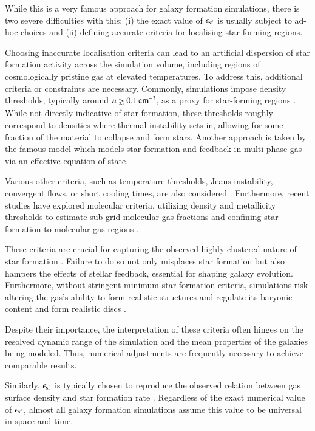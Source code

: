 \documentclass{aa}
\def\gtrsim{\mathrel{\hbox{\rlap{\hbox{\lower4pt\hbox{$\sim$}}}\hbox{$>$}}}}
\begin{document}
While this is a very famous approach for galaxy formation simulations, there is two severe difficulties with this: (i) the exact value of $\epsilon_{\rm sf}$ is usually subject to ad-hoc choices and (ii) defining accurate criteria for localising star forming regions.

Choosing inaccurate localisation criteria can lead to an artificial dispersion of star formation activity across the simulation volume, including regions of cosmologically pristine gas at elevated temperatures. To address this, additional criteria or constraints are necessary. Commonly, simulations impose density thresholds, typically around \( n \gtrsim 0.1\, \text{cm}^{-3} \), as a proxy for star-forming regions \citep[e.g.][]{Stinson_2006}. While not directly indicative of star formation, these thresholds roughly correspond to densities where thermal instability sets in, allowing for some fraction of the material to collapse and form stars. Another approach is taken by the famous \cite{Springel_2003} model which models star formation and feedback in multi-phase gas via an effective equation of state.

Various other criteria, such as temperature thresholds, Jeans instability, convergent flows, or short cooling times, are also considered \citep[see e.g.][for a comparison of such criteria]{Hopkins_2013}. Furthermore, recent studies have explored molecular criteria, utilizing density and metallicity thresholds to estimate sub-grid molecular gas fractions and confining star formation to molecular gas regions \citep[e.g.][]{Robertson2008,Kuhlen2012,Christensen2012}.

These criteria are crucial for capturing the observed highly clustered nature of star formation \citep[e.g.][]{Lada2003,Dutton2019,Dutton2020,Buck_2019}. Failure to do so not only misplaces star formation but also hampers the effects of stellar feedback, essential for shaping galaxy evolution. Furthermore, without stringent minimum star formation criteria, simulations risk altering the gas's ability to form realistic structures \citep[e.g.][]{Saitoh2008} and regulate its baryonic content \citep[e.g.][]{Governato2010} and form realistic discs \citep{Stinson2013}.

Despite their importance, the interpretation of these criteria often hinges on the resolved dynamic range of the simulation and the mean properties of the galaxies being modeled. Thus, numerical adjustments are frequently necessary to achieve comparable results.

Similarly, $\epsilon_{\rm sf}$ is typically chosen to reproduce the observed relation between gas surface density and star formation rate \citep{Schmidt_1959,Schmidt1963,Kennicutt1998,Bigiel2008,Kennicutt2012}. Regardless of the exact numerical value of $\epsilon_{\rm sf}$, almost all galaxy formation simulations assume this value to be universal in space and time.
\end{document}
